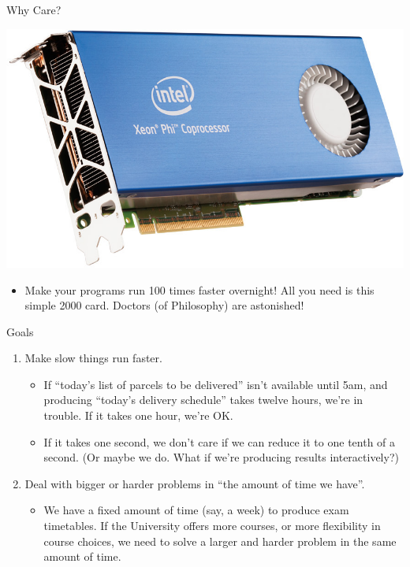 \documentclass{beamer}
\begin{document}
\begin{frame}{Why Care?}
    \begin{center}
        \includegraphics*[keepaspectratio=true,scale=0.2]{xeon-phi.jpg}
    \end{center}

    \begin{itemize}
        \item Make your programs run 100 times faster overnight! All you need is this simple
            \textsterling{}2000 card. Doctors (of Philosophy) are astonished!
    \end{itemize}
\end{frame}

\begin{frame}{Goals}
    \begin{enumerate}
        \item Make slow things run faster.
            \begin{itemize}
                \item If ``today's list of parcels to be delivered'' isn't available until 5am, and
                    producing ``today's delivery schedule'' takes twelve hours, we're in trouble. If
                    it takes one hour, we're OK.

                \item If it takes one second, we don't care if we can reduce it to one tenth of a
                    second. (Or maybe we do. What if we're producing results interactively?)
            \end{itemize}

        \item Deal with bigger or harder problems in ``the amount of time we have''.
            \begin{itemize}
                \item We have a fixed amount of time (say, a week) to produce exam timetables. If
                    the University offers more courses, or more flexibility in course choices, we
                    need to solve a larger and harder problem in the same amount of time.
            \end{itemize}
    \end{enumerate}
\end{frame}
\end{document}
